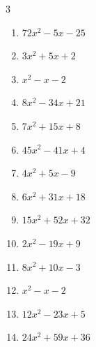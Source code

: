 \begin{multicols}{3}
\begin{enumerate}
  \item $72x^{2}-5x-25$

        \phantom{$=(8x-5)(9x+5)$}

  \item $3x^{2}+5x+2$

        \phantom{$=(3x+2)(x+1)$}

  \item $x^{2}-x-2$

        \phantom{$=(x-2)(x+1)$}

\columnbreak %

\resetques

  \item $8x^{2}-34x+21$

        \phantom{$=(4x-3)(2x-7)$}

  \item $7x^{2}+15x+8$

        \phantom{$=(7x+8)(x+1)$}

  \item $45x^{2}-41x+4$

        \phantom{$=(5x-4)(9x-1)$}

  \item $4x^{2}+5x-9$

        \phantom{$=(4x+9)(x-1)$}

  \item $6x^{2}+31x+18$

        \phantom{$=(3x+2)(2x+9)$}

  \item $15x^{2}+52x+32$

        \phantom{$=(5x+4)(3x+8)$}

  \item $2x^{2}-19x+9$

        \phantom{$=(x-9)(2x-1)$}

  \item $8x^{2}+10x-3$

        \phantom{$=(4x-1)(2x+3)$}

  \item $x^{2}-x-2$

        \phantom{$=(x-2)(x+1)$}

  \item $12x^{2}-23x+5$

        \phantom{$=(4x-1)(3x-5)$}

\columnbreak %

  \item $24x^{2}+59x+36$

        \phantom{$=(8x+9)(3x+4)$}


\end{enumerate}
\end{multicols}
